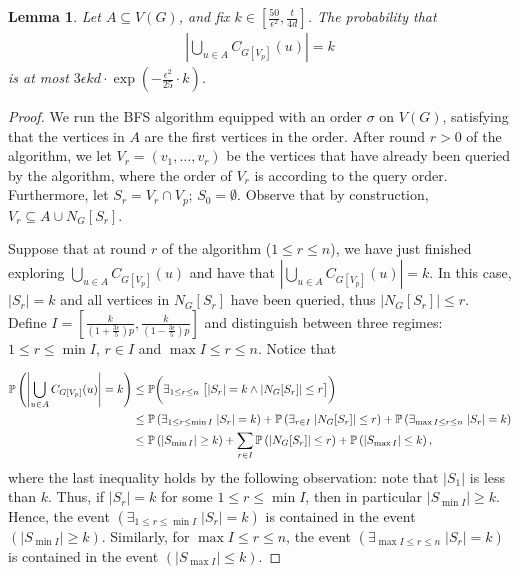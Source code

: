 \documentclass[10pt,a4paper]{amsart}
\newtheorem{lemma}{Lemma}
\begin{document}
\begin{lemma}\label{nsc_general_general}
    Let $A\subseteq V(G)$, and fix $k\in \left[\frac{50}{\epsilon^2}, \frac{t}{4d}\right]$. The probability that
    \begin{align*}
        \left|\bigcup_{u\in A} C_{G[V_p]}(u)\right|=k
    \end{align*}
    is at most $3\epsilon kd\cdot \exp\left(-\frac{\epsilon^2}{25}\cdot k\right)$.
\end{lemma}

\begin{proof}
    We run the BFS algorithm equipped with an order $\sigma$ on $V(G)$, satisfying that the vertices in $A$ are the first vertices in the order.
    After round $r>0$ of the algorithm, we let $V_r=(v_1,\dots,v_r)$ be the vertices that have already been queried by the algorithm, where the order of $V_r$ is according to the query order. Furthermore, let $S_r=V_r\cap V_p$; $S_0=\emptyset$. Observe that by construction, $V_r\subseteq A\cup N_G[S_r]$.

    Suppose that at round $r$ of the algorithm ($1\le r \le n$), we have just finished exploring $\bigcup_{u\in A} C_{G[V_p]}(u)$ and have that $\left|\bigcup_{u\in A} C_{G[V_p]}(u)\right|=k$. In this case, $|S_r|=k$ and all vertices in $N_G[S_r]$ have been queried, thus $|N_G[S_r]|\le r$. Define $I=\left[\frac{k}{\left(1+\frac{3\epsilon}{5}\right)p},\frac{k}{\left(1-\frac{3\epsilon}{5}\right)p}\right]$ and distinguish between three regimes: $1\le r\le \min I$, $r\in I$ and $\max I\le r\le n$. Notice that

    \begin{align}\label{maineq}
    \notag
        \mathbb{P}\left(\left|\bigcup_{u\in A} C_{G[V_p]}(u)\right|=k\right)&\le \mathbb{P}\bigg(\exists_{1\le r\le n}\;\big[|S_r|=k\wedge |N_G[S_r]|\le r\big]\bigg)\\\notag
        &\le \mathbb{P}\left(\exists_{1\le r\le \min I}\;|S_r|=k\right)+\mathbb{P}\left(\exists_{r\in I}\;|N_G[S_r]|\le r\right)+\mathbb{P}\left(\exists_{\max I\le r\le n}\;|S_r|=k\right)\\
        &\le \mathbb{P}\left(|S_{\min I}|\ge k\right)+\sum_{r\in I}\mathbb{P}\left(|N_G[S_r]|\le r\right)+\mathbb{P}\left(|S_{\max I}|\le k\right),
    \end{align}
    where the last inequality holds by the following observation: note that $|S_1|$ is less than $k$. Thus, if $|S_r|=k$ for some $1\le r \le \min I$, then in particular $|S_{\min I}|\ge k$. Hence, the event $\left(\exists_{1\le r\le \min I}\;|S_r|=k\right)$ is contained in the event $\left(|S_{\min I}|\ge k\right)$. Similarly, for $\max I\le r\le n$, the event $\left(\exists_{\max I\le r\le n}\;|S_r|=k\right)$ is contained in the event $\left(|S_{\max I}|\le k\right)$.


\end{proof}
\end{document}
